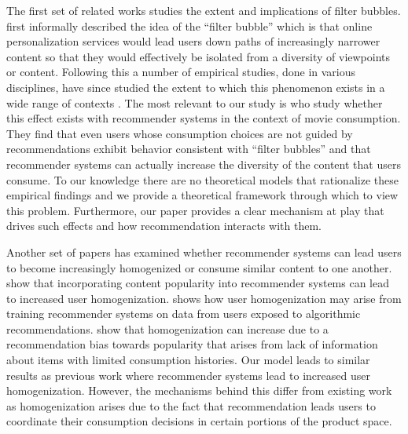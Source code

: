 \documentclass[format=acmsmall, review=false]{acmart}
\newcommand{\xhdr}[1]{\vspace{1mm} \noindent{\bf #1}}
\begin{document}
\par
\xhdr{Related Work.} 
The first set of related works studies the extent and implications of filter bubbles. \cite{pariser2011filter} first informally described the idea of the ``filter bubble'' which is that online personalization services would lead users down paths of increasingly narrower content so that they would effectively be isolated from a diversity of viewpoints or content. Following this a number of empirical studies, done in various disciplines, have since studied the extent to which this phenomenon exists in a wide range of contexts \cite{flaxman2016filter,hosanagar2013will,moller2018blame,nguyen2014exploring}. The most relevant to our study is \cite{nguyen2014exploring} who study whether this effect exists with recommender systems in the context of movie consumption. They find that even users whose consumption choices are not guided by recommendations exhibit behavior consistent with ``filter bubbles'' and that recommender systems can actually increase the diversity of the content that users consume. To our knowledge there are no theoretical models that rationalize these empirical findings and we provide a theoretical framework through which to view this problem. Furthermore, our paper provides a clear mechanism at play that drives such effects and how recommendation interacts with them.
\par 
Another set of papers has examined whether recommender systems can lead users to become increasingly homogenized or consume similar content to one another. \cite{celma2008hits, treviranus2009value} show that incorporating content popularity into recommender systems can lead to increased user homogenization. \cite{chaney2018algorithmic} shows how user homogenization may arise from training recommender systems on data from users exposed to algorithmic recommendations. \cite{fleder2009blockbuster} show that homogenization can increase due to a recommendation bias towards popularity that arises from lack of information about items with limited consumption histories. Our model leads to similar results as previous work where recommender systems lead to increased user homogenization. However, the mechanisms behind this differ from existing work as homogenization arises due to the fact that recommendation leads users to coordinate their consumption decisions in certain portions of the product space.
\par
\end{document}
